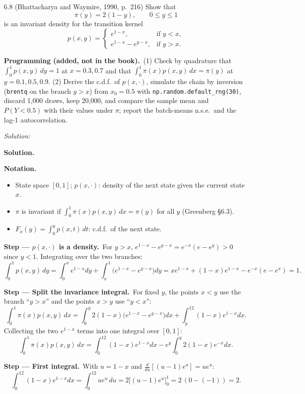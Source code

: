 \documentclass[11pt,a4paper]{article}
\newif\ifsolucoes
\newcommand{\espacoresol}{4.5cm}   %
\numberwithin{equation}{questao}   %
\newcommand{\programacao}{\par\smallskip\noindent\textbf{Programming (added, not in the book).}~}
\newenvironment{notacao}{\par\smallskip\noindent\textbf{Notation.}\begin{itemize}[leftmargin=1.4em,topsep=1pt,itemsep=0pt]\small}{\end{itemize}}
\newcommand{\resolespaco}{\ifsolucoes\else\par\textit{Solution:}\vspace{\espacoresol}\par\fi}
\newcommand{\passo}[2]{\par\smallskip\noindent\textbf{Step --- #1.}~#2}
\newcommand{\solhead}{\par\medskip\noindent{\color{blue!55!black}\rule{\linewidth}{0.3pt}}\par\noindent\textbf{Solution.}}
\newcommand{\1}{\mathbf{1}}
\begin{document}
6.8 (Bhattacharya and Waymire, 1990, p.~216) Show that
\[
\pi(y)=2(1-y),\qquad 0\le y\le1
\]
is an invariant density for the transition kernel
\[
p(x,y)=\begin{cases}e^{1-x}, & \text{if } y<x,\\ e^{1-x}-e^{y-x}, & \text{if } y>x.\end{cases}
\]
\programacao (1) Check by quadrature that $\int_0^1p(x,y)\,dy=1$ at $x=0.3,0.7$ and that
$\int_0^1\pi(x)p(x,y)\,dx=\pi(y)$ at $y=0.1,0.5,0.9$. (2) Derive the c.d.f.\ of $p(x,\cdot)$, simulate the
chain by inversion (\texttt{brentq} on the branch $y>x$) from $x_0=0.5$ with
\texttt{np.random.default\_rng(30)}, discard 1{,}000 draws, keep 20{,}000, and compare the sample mean
and $P(Y<0.5)$ with their values under $\pi$; report the batch-means n.s.e.\ and the lag-1
autocorrelation.
\resolespaco
\begin{sol}
\solhead
\begin{notacao}
\item State space $[0,1]$; $p(x,\cdot)$: density of the next state given the current state $x$.
\item $\pi$ is invariant if $\int_0^1\pi(x)p(x,y)\,dx=\pi(y)$ for all $y$ (Greenberg §6.3).
\item $F_x(y)=\int_0^yp(x,t)\,dt$: c.d.f.\ of the next state.
\end{notacao}

\passo{$p(x,\cdot)$ is a density}{For $y>x$, $e^{1-x}-e^{y-x}=e^{-x}(e-e^y)>0$ since $y<1$. Integrating
over the two branches:}
\begin{equation}\label{q30:norm}
\int_0^1p(x,y)\,dy=\int_0^xe^{1-x}dy+\int_x^1\big(e^{1-x}-e^{y-x}\big)dy=xe^{1-x}+(1-x)e^{1-x}-e^{-x}(e-e^{x})=1 .
\end{equation}

\passo{Split the invariance integral}{For fixed $y$, the points $x<y$ use the branch ``$y>x$'' and
the points $x>y$ use ``$y<x$'':}
\begin{equation}\label{q30:split}
\int_0^1\pi(x)p(x,y)\,dx=\int_0^y2(1-x)\big(e^{1-x}-e^{y-x}\big)dx+\int_y^12(1-x)e^{1-x}dx .
\end{equation}
Collecting the two $e^{1-x}$ terms into one integral over $[0,1]$:
\begin{equation}\label{q30:two}
\int_0^1\pi(x)p(x,y)\,dx=\int_0^12(1-x)e^{1-x}dx-e^{y}\int_0^y2(1-x)e^{-x}dx .
\end{equation}

\passo{First integral}{With $u=1-x$ and $\frac{d}{du}[(u-1)e^u]=ue^u$:}
\[
\int_0^12(1-x)e^{1-x}dx=\int_0^12ue^u\,du=2\big[(u-1)e^u\big]_0^1=2\,(0-(-1))=2 .
\]


\end{sol}
\end{document}
